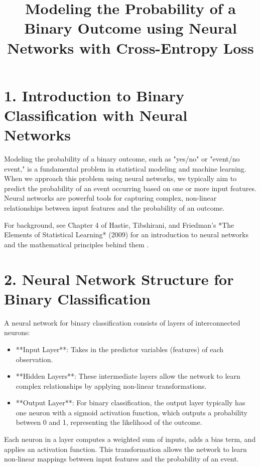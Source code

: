 \documentclass{article}
\title{Modeling the Probability of a Binary Outcome using Neural Networks with Cross-Entropy Loss}
\author{}
\date{}
\begin{document}
\maketitle

\section*{1. Introduction to Binary Classification with Neural Networks}

Modeling the probability of a binary outcome, such as "yes/no" or "event/no event," is a fundamental problem in statistical modeling and machine learning. When we approach this problem using neural networks, we typically aim to predict the probability of an event occurring based on one or more input features. Neural networks are powerful tools for capturing complex, non-linear relationships between input features and the probability of an outcome.

For background, see Chapter 4 of Hastie, Tibshirani, and Friedman's *The Elements of Statistical Learning* (2009) for an introduction to neural networks and the mathematical principles behind them \cite{hastie2009elements}.

\section*{2. Neural Network Structure for Binary Classification}

A neural network for binary classification consists of layers of interconnected neurons:
\begin{itemize}
    \item **Input Layer**: Takes in the predictor variables (features) of each observation.
    \item **Hidden Layers**: These intermediate layers allow the network to learn complex relationships by applying non-linear transformations.
    \item **Output Layer**: For binary classification, the output layer typically has one neuron with a sigmoid activation function, which outputs a probability between 0 and 1, representing the likelihood of the outcome.
\end{itemize}

Each neuron in a layer computes a weighted sum of inputs, adds a bias term, and applies an activation function. This transformation allows the network to learn non-linear mappings between input features and the probability of an event.
\end{document}
